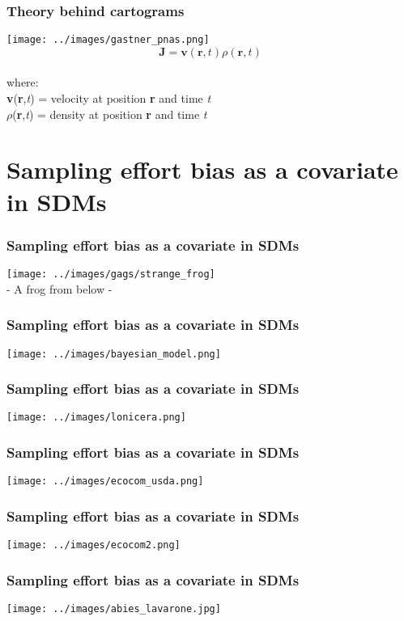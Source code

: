 \documentclass{beamer}
\begin{document}
\begin{frame}
\frametitle{Theory behind cartograms}
\centering
\texttt{[image: ../images/gastner\_pnas.png]}\\

\begin{equation}
 \textbf{J} = \textbf{v}(\textbf{r},\textit{t})\rho(\textbf{r},\textit{t})
\end{equation}\\
where:\\ \textbf{v}(\textbf{r},\textit{t}) = velocity at position \textbf{r} and time \textit{t} \\ $\rho$(\textbf{r},\textit{t}) = density at position \textbf{r} and time \textit{t}

\end{frame}
%  
\section{Sampling effort bias as a covariate in SDMs}

\begin{frame}
\frametitle{Sampling effort bias as a covariate in SDMs}
\centering
\texttt{[image: ../images/gags/strange\_frog]}\\
- A frog from below -
\end{frame}
% 
\begin{frame}
\frametitle{Sampling effort bias as a covariate in SDMs}
\centering
\texttt{[image: ../images/bayesian\_model.png]}
\end{frame}
% 
\begin{frame}
\frametitle{Sampling effort bias as a covariate in SDMs}
\centering
\texttt{[image: ../images/lonicera.png]}\\
\end{frame}
% 
\begin{frame}
\frametitle{Sampling effort bias as a covariate in SDMs}
\centering
\texttt{[image: ../images/ecocom\_usda.png]}\\
\end{frame}
% 
\begin{frame}
\frametitle{Sampling effort bias as a covariate in SDMs}
\centering
\texttt{[image: ../images/ecocom2.png]}\\
\end{frame}

% 
\begin{frame}
\frametitle{Sampling effort bias as a covariate in SDMs}
\centering
\texttt{[image: ../images/abies\_lavarone.jpg]}\\
\end{frame}
\end{document}
